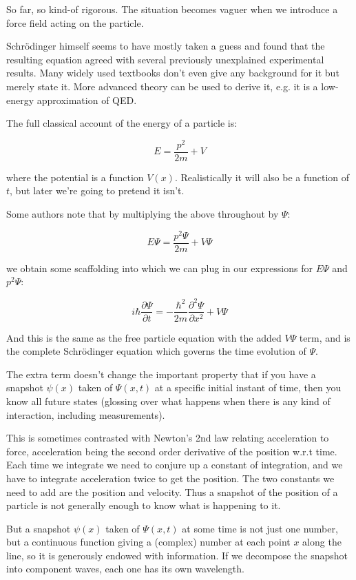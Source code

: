 So far, so kind-of rigorous. The situation becomes vaguer when we introduce a force field acting on the particle.

Schrödinger himself seems to have mostly taken a guess and found that the resulting equation agreed with several previously unexplained experimental results. Many widely used textbooks don't even give any background for it but merely state it. More advanced theory can be used to derive it, e.g. it is a low-energy approximation of QED.

The full classical account of the energy of a particle is:

$$
E = \frac{p^2}{2m} + V
$$

where the potential is a function $V(x)$. Realistically it will also be a function of $t$, but later we're going to pretend it isn't.

Some authors note that by multiplying the above throughout by $\Psi$:

$$
E\Psi = \frac{p^2{\Psi}}{2m} + V{\Psi}
$$

we obtain some scaffolding into which we can plug in our expressions for $E \Psi$ and $p^2 \Psi$:

\begin{equation}
i\hbar \frac{\partial \Psi}{\partial t}
=
- \frac{\hbar^2}{2m} \frac{\partial^2 \Psi}{\partial x^2}
+ V{\Psi}
\label{eqn:se}
\end{equation}

And this is the same as the free particle equation with the added $V\Psi$ term, and is the complete Schrödinger equation which governs the time evolution of $\Psi$.

The extra term doesn't change the important property that if you have a snapshot $\psi(x)$ taken of $\Psi(x, t)$ at a specific initial instant of time, then you know all future states (glossing over what happens when there is any kind of interaction, including measurements).

This is sometimes contrasted with Newton's 2nd law relating acceleration to force, acceleration being the second order derivative of the position w.r.t time. Each time we integrate we need to conjure up a constant of integration, and we have to integrate acceleration twice to get the position. The two constants we need to add are the position and velocity. Thus a snapshot of the position of a particle is not generally enough to know what is happening to it.

But a snapshot $\psi(x)$ taken of $\Psi(x, t)$ at some time is not just one number, but a continuous function giving a (complex) number at each point $x$ along the line, so it is generously endowed with information. If we decompose the snapshot into component waves, each one has its own wavelength.

